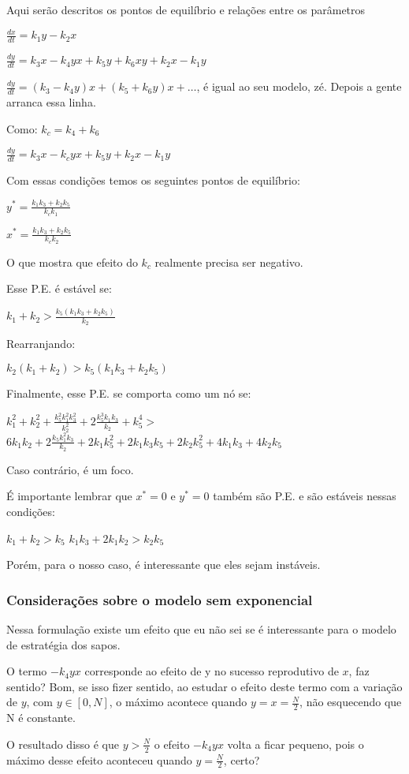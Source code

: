 Aqui serão descritos os pontos de equilíbrio e relações entre os parâmetros

\vspace{3 mm}
$\frac{dx}{dt} = k_1 y - k_2 x$

\vspace{3 mm}
$\frac{dy}{dt} = k_3 x - k_4 y x + k_5 y + k_6 x y + k_2 x - k_1 y$

\vspace{3 mm}
$\frac{dy}{dt} = (k_3 - k_4 y)x + (k_5 + k_6 y)x + \ldots$, é igual ao seu modelo, zé. Depois a gente arranca essa linha.

\vspace{3 mm}
Como: $k_c= k_4+k_6$

\vspace{3 mm}
$\frac{dy}{dt} = k_3 x - k_c y x + k_5 y + k_2 x - k_1 y$

Com essas condições temos os seguintes pontos de equilíbrio:

$y^* = \frac{k_1 k_3 + k_2 k_5}{k_c k_1}$

\vspace{3 mm}
$x^* = \frac{k_1 k_3 + k_2 k_5}{k_c k_2}$

O que mostra que efeito do $k_c$ realmente precisa ser negativo.

Esse P.E. é estável se:


$k_1 + k_2 > \frac{k_5(k_1 k_3 + k_2 k_5)}{k_2}$
\vspace{3 mm}

Rearranjando:

\vspace{3 mm}
$k_2(k_1 + k_2) > k_5(k_1 k_3 + k_2 k_5)$

Finalmente, esse P.E. se comporta como um nó se:

$k^2_1 + k_2^2 + \frac{k_5^2 k_1^2 k_3^2}{k_2^2} +2 \frac{k_5^3 k_1 k_3}{k_2} +k_5^4 > $
$ 6 k_1 k_2 + 2 \frac{k_5 k_1^2 k_3}{k_2} + 2 k_1 k_5^2 + 2k_1 k_3 k_5 + 2 k_2 k_5^2 + 4 k_1 k_3 + 4 k_2 k_5$ 

Caso contrário, é um foco.

É importante lembrar que $x^*=0$ e $y^*=0$ também são P.E. e são estáveis nessas condições:

\vspace{3 mm}
$k_1 + k_2 > k_5$
$k_1 k_3 + 2k_1 k_2 > k_2 k_5$

Porém, para o nosso caso, é interessante que eles sejam instáveis.

\subsubsection{Considerações sobre o modelo sem exponencial}
Nessa formulação existe um efeito que eu não sei se é interessante para o modelo de estratégia dos sapos.

O termo $-k_4 yx$ corresponde ao efeito de y no sucesso reprodutivo de $x$, faz sentido? Bom, se isso fizer sentido, ao estudar o efeito deste termo com a variação de $y$, com $y \in [0,N]$, o máximo acontece quando $y=x=\frac{N}{2}$, não esquecendo que N é constante.

O resultado disso é que $y > \frac{N}{2}$ o efeito $-k_4 yx$ volta a ficar pequeno, pois o máximo desse efeito aconteceu quando $y=\frac{N}{2}$, certo?